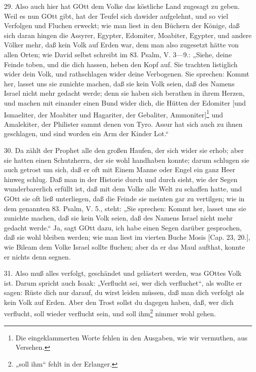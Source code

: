 29. Also auch hier hat GOtt dem Volke das köstliche Land zugesagt zu geben. Weil es nun GOtt gibt, hat der Teufel sich dawider aufgelehnt, und so viel Verfolgen und Fluchen erweckt; wie man liest in den Büchern der Könige, daß sich daran hingen die Assyrer, Egypter, Edomiter, Moabiter, Egypter, und andere Völker mehr, daß kein Volk auf Erden war, dem man
also zugesetzt hätte von allen Orten; wie David selbst schreibt im 83. Psalm, V. 3—9.: „Siehe, deine Feinde toben, und die dich hassen, heben den Kopf auf. Sie trachten listiglich wider dein Volk, und rathschlagen wider deine Verbogenen. Sie sprechen: Kommt her, lasset uns sie zunichte machen, daß sie kein Volk seien, daß des Namens Israel nicht mehr gedacht werde; denn sie haben sich berathen in ihrem Herzen, und machen mit einander einen Bund wider dich, die Hütten der Edomiter [und Ismaeliter, der Moabiter und Hagariter, der Gebaliter, Ammoniter]\footnote{Die eingeklammerten Worte fehlen in den Ausgaben, wie wir vermuthen, aus Versehen.} und Amalekiter, der Philister sammt denen von Tyro. Assur hat sich auch zu ihnen geschlagen, und sind worden ein Arm der Kinder Lot.“

30. Da zählt der Prophet alle den großen Haufen, der sich wider sie erhob; aber sie hatten einen Schutzherrn, der sie wohl handhaben konnte; darum schlugen sie auch getrost um sich, daß er oft mit Einem Manne oder Engel ein ganz Heer hinweg schlug. Daß man in der Historie durch und durch sieht, wie der Segen wunderbarerlich erfüllt ist, daß mit dem Volke alle Welt zu schaffen hatte, und GOtt sie oft ließ unterliegen, daß die Feinde sie meinten gar zu vertilgen; wie in dem genannten 83. Psalm, V. 5., steht: „Sie sprechen: Kommt her, lasset uns sie zunichte machen, daß sie kein Volk seien, daß des Namens Israel nicht mehr gedacht werde.“ Ja, sagt GOtt dazu, ich habe einen Segen darüber gesprochen, daß sie wohl bleiben werden; wie man liest im vierten Buche Mosis [Cap. 23, 20.], wie Bileam dem Volke Israel sollte fluchen; aber da er das Maul aufthat, konnte er nichts denn segnen.

31. Also muß alles verfolgt, geschändet und gelästert werden, was GOttes Volk ist. Darum spricht auch Isaak: „Verflucht sei, wer dich verfluchet“, als wollte er sagen: Rüste dich nur darauf, du wirst leiden müssen, daß man dich verfolgt als kein Volk auf Erden. Aber den Trost sollst du dagegen haben, daß, wer dich verflucht, soll wieder verflucht sein, und soll ihm\footnote{„soll ihm“ fehlt in der Erlanger.} nimmer wohl gehen.

